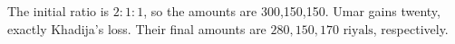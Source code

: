 The initial ratio is $2:1:1$, so the amounts are 300,150,150. Umar gains twenty, exactly Khadija's loss. Their final amounts are $\boxed{280,150,170\text{ riyals}}$, respectively.

